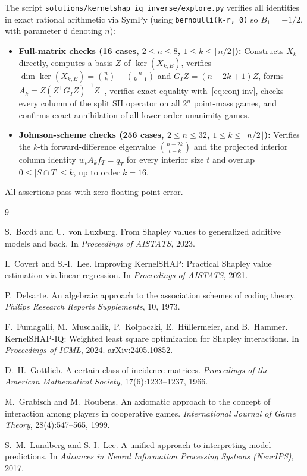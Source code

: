 \documentclass[11pt]{article}
\theoremstyle{plain}
\theoremstyle{definition}
\theoremstyle{remark}
\begin{document}
The script \texttt{solutions/kernelshap\_iq\_inverse/explore.py} verifies all identities in exact rational arithmetic via SymPy (using \texttt{bernoulli(k-r, 0)} so $B_1 = -1/2$, with parameter \texttt{d} denoting $n$):
\begin{itemize}[leftmargin=*]
\item \textbf{Full-matrix checks (16 cases, $2 \le n \le 8$, $1 \le k \le \lfloor n/2 \rfloor$):} Constructs $X_k$ directly, computes a basis $Z$ of $\ker(X_{k,E})$, verifies $\dim \ker(X_{k,E}) = \binom{n}{k} - \binom{n}{k-1}$ and $G_I Z = (n - 2k + 1) Z$, forms $A_k = Z(Z^\top G_I Z)^{-1} Z^\top$, verifies exact equality with~\eqref{eq:conj-inv}, checks every column of the split SII operator on all $2^n$ point-mass games, and confirms exact annihilation of all lower-order unanimity games.
\item \textbf{Johnson-scheme checks (256 cases, $2 \le n \le 32$, $1 \le k \le \lfloor n/2 \rfloor$):} Verifies the $k$-th forward-difference eigenvalue $\binom{n - 2k}{t - k}$ and the projected interior column identity $w_t A_k f_T = q_T$ for every interior size $t$ and overlap $0 \le |S \cap T| \le k$, up to order $k = 16$.
\end{itemize}
All assertions pass with zero floating-point error.

\begin{thebibliography}{9}

S.~Bordt and U.~von Luxburg.
From Shapley values to generalized additive models and back.
In \emph{Proceedings of AISTATS}, 2023.

I.~Covert and S.-I.~Lee.
Improving KernelSHAP: Practical Shapley value estimation via linear regression.
In \emph{Proceedings of AISTATS}, 2021.

P.~Delsarte.
An algebraic approach to the association schemes of coding theory.
\emph{Philips Research Reports Supplements}, 10, 1973.

F.~Fumagalli, M.~Muschalik, P.~Kolpaczki, E.~H\"ullermeier, and B.~Hammer.
KernelSHAP-IQ: Weighted least square optimization for Shapley interactions.
In \emph{Proceedings of ICML}, 2024. \href{https://arxiv.org/abs/2405.10852}{arXiv:2405.10852}.

D.~H.~Gottlieb.
A certain class of incidence matrices.
\emph{Proceedings of the American Mathematical Society}, 17(6):1233--1237, 1966.

M.~Grabisch and M.~Roubens.
An axiomatic approach to the concept of interaction among players in cooperative games.
\emph{International Journal of Game Theory}, 28(4):547--565, 1999.

S.~M.~Lundberg and S.-I.~Lee.
A unified approach to interpreting model predictions.
In \emph{Advances in Neural Information Processing Systems (NeurIPS)}, 2017.

\end{thebibliography}
\end{document}
